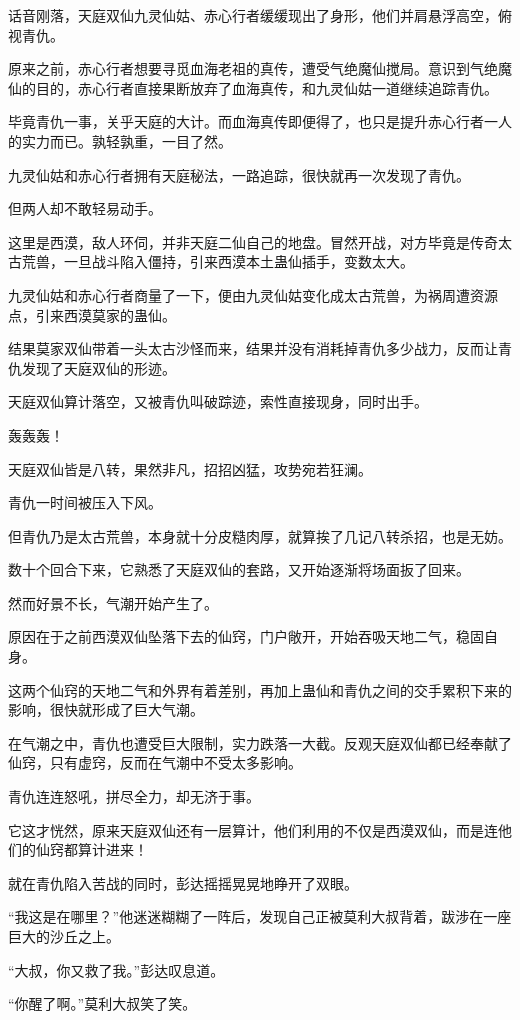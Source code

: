 \begin{this_body}
话音刚落，天庭双仙九灵仙姑、赤心行者缓缓现出了身形，他们并肩悬浮高空，俯视青仇。

原来之前，赤心行者想要寻觅血海老祖的真传，遭受气绝魔仙搅局。意识到气绝魔仙的目的，赤心行者直接果断放弃了血海真传，和九灵仙姑一道继续追踪青仇。

毕竟青仇一事，关乎天庭的大计。而血海真传即便得了，也只是提升赤心行者一人的实力而已。孰轻孰重，一目了然。

九灵仙姑和赤心行者拥有天庭秘法，一路追踪，很快就再一次发现了青仇。

但两人却不敢轻易动手。

这里是西漠，敌人环伺，并非天庭二仙自己的地盘。冒然开战，对方毕竟是传奇太古荒兽，一旦战斗陷入僵持，引来西漠本土蛊仙插手，变数太大。

九灵仙姑和赤心行者商量了一下，便由九灵仙姑变化成太古荒兽，为祸周遭资源点，引来西漠莫家的蛊仙。

结果莫家双仙带着一头太古沙怪而来，结果并没有消耗掉青仇多少战力，反而让青仇发现了天庭双仙的形迹。

天庭双仙算计落空，又被青仇叫破踪迹，索性直接现身，同时出手。

轰轰轰！

天庭双仙皆是八转，果然非凡，招招凶猛，攻势宛若狂澜。

青仇一时间被压入下风。

但青仇乃是太古荒兽，本身就十分皮糙肉厚，就算挨了几记八转杀招，也是无妨。

数十个回合下来，它熟悉了天庭双仙的套路，又开始逐渐将场面扳了回来。

然而好景不长，气潮开始产生了。

原因在于之前西漠双仙坠落下去的仙窍，门户敞开，开始吞吸天地二气，稳固自身。

这两个仙窍的天地二气和外界有着差别，再加上蛊仙和青仇之间的交手累积下来的影响，很快就形成了巨大气潮。

在气潮之中，青仇也遭受巨大限制，实力跌落一大截。反观天庭双仙都已经奉献了仙窍，只有虚窍，反而在气潮中不受太多影响。

青仇连连怒吼，拼尽全力，却无济于事。

它这才恍然，原来天庭双仙还有一层算计，他们利用的不仅是西漠双仙，而是连他们的仙窍都算计进来！

就在青仇陷入苦战的同时，彭达摇摇晃晃地睁开了双眼。

“我这是在哪里？”他迷迷糊糊了一阵后，发现自己正被莫利大叔背着，跋涉在一座巨大的沙丘之上。

“大叔，你又救了我。”彭达叹息道。

“你醒了啊。”莫利大叔笑了笑。


\end{this_body}
